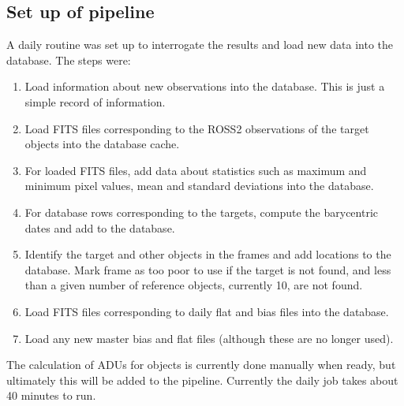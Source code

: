 \subsection{Set up of pipeline}
\protect\label{section:pipeline}

A daily routine was set up to interrogate the {\rem} results and load new data
into the database. The steps were:

\begin{enumerate}
  \item Load information about new observations into the database. This is just
  a simple record of information.
  \item Load FITS files corresponding to the ROSS2 observations of the target
  objects into the database cache.
  \item For loaded FITS files, add data about statistics such as maximum and
  minimum pixel values, mean and standard deviations into the database.
  \item For database rows corresponding to the targets, compute the barycentric
  dates and add to the database.
  \item Identify the target and other objects in the frames and add locations to
  the database. Mark frame as too poor to use if the target is not found, and
  less than a given number of reference objects, currently 10, are not found.
  \item Load FITS files corresponding to daily flat and bias files into the
  database.
  \item Load any new master bias and flat files (although these are no longer
  used).
\end{enumerate}

The calculation of ADUs for objects is currently done manually when ready, but
ultimately this will be added to the pipeline. Currently the daily job takes
about 40 minutes to run.
